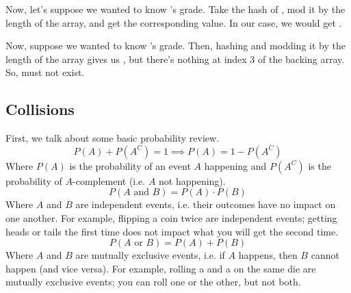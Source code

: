 \documentclass[letterpaper]{article}
\begin{document}
Now, let's suppose we wanted to know 's grade. Take the hash of , mod it by the length of the array, and get the corresponding value. In our case, we would get . 

\bigskip

Now, suppose we wanted to know 's grade. Then, hashing  and modding it by the length of the array gives us , but there's nothing at index 3 of the backing array. So,  must not exist. 


\subsection{Collisions}
First, we talk about some basic probability review. 
\[P(A) + P(A^C) = 1 \implies P(A) = 1 - P(A^C)\]
Where $P(A)$ is the probability of an event $A$ happening and $P(A^C)$ is the probability of $A$-complement (i.e. $A$ not happening).
\[P(A \text{ and } B) = P(A) \cdot P(B)\]
Where $A$ and $B$ are independent events, i.e. their outcomes have no impact on one another. For example, flipping a coin twice are independent events; getting heads or tails the first time does not impact what you will get the second time. 
\[P(A \text{ or } B) = P(A) + P(B)\]
Where $A$ and $B$ are mutually exclusive events, i.e. if $A$ happens, then $B$ cannot happen (and vice versa). For example, rolling a  and a  on the same die are mutually exclusive events; you can roll one or the other, but not both. 

\bigskip
\end{document}
